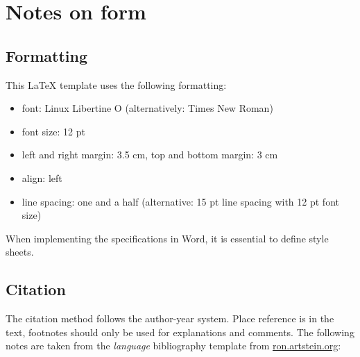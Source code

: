 \documentclass[12pt,letterpaper]{article} %
\begin{document}
\section{Notes on form}
\subsection{Formatting} 

This LaTeX template uses the following formatting:
\begin{itemize}
\setlength{\itemsep}{0pt}
	\item font: Linux Libertine O (alternatively: Times New Roman)
	\item font size: 12 pt
	\item left and right margin: 3.5 cm, top and bottom margin: 3 cm
    \item align: left
	\item line spacing: one and a half (alternative: 15 pt line spacing with 12 pt font size)
\end{itemize}

\noindent
When implementing the specifications in Word, it is essential to define style sheets.

\subsection{Citation} 
\label{sec:cit}

The citation method follows the author-year system. Place reference is in the text, footnotes should only be used for explanations and comments. The following notes are taken from the \emph{language} bibliography template from \url{ron.artstein.org}:\newline
\end{document}
